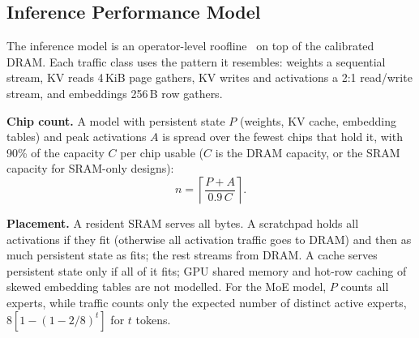 \documentclass[12pt]{article}
\begin{document}
\subsection{Inference Performance Model}
The inference model is an operator-level roofline~\cite{williams2009} on top of the calibrated DRAM. Each traffic class uses the pattern it resembles: weights a sequential stream, KV reads 4\,KiB page gathers, KV writes and activations a 2:1 read/write stream, and embeddings 256\,B row gathers.

\textbf{Chip count.} A model with persistent state $P$ (weights, KV cache, embedding tables) and peak activations $A$ is spread over the fewest chips that hold it, with 90\% of the capacity $C$ per chip usable ($C$ is the DRAM capacity, or the SRAM capacity for SRAM-only designs):
\begin{equation}
n = \left\lceil \frac{P + A}{0.9\, C} \right\rceil .\label{eq:chips}
\end{equation}

\textbf{Placement.} A resident SRAM serves all bytes. A scratchpad holds all activations if they fit (otherwise all activation traffic goes to DRAM) and then as much persistent state as fits; the rest streams from DRAM. A cache serves persistent state only if all of it fits; GPU shared memory and hot-row caching of skewed embedding tables are not modelled. For the MoE model, $P$ counts all experts, while traffic counts only the expected number of distinct active experts, $8[1-(1-2/8)^{t}]$ for $t$ tokens.
\end{document}
